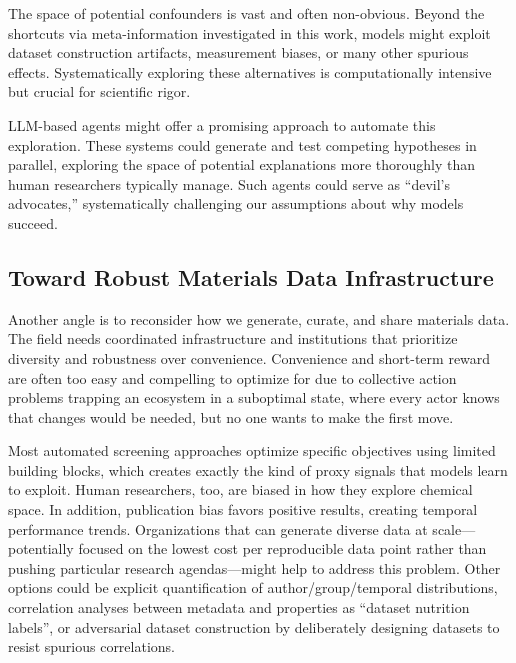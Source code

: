 \documentclass[11pt, oneside]{article}
\begin{document}
The space of potential confounders is vast and often non-obvious. Beyond the shortcuts via meta-information investigated in this work, models might exploit dataset construction artifacts, measurement biases, or many other spurious effects.\autocite{Zhou2025, Jones2024} 
Systematically exploring these alternatives is computationally intensive but crucial for scientific rigor.

LLM-based agents might offer a promising approach to automate this exploration.\autocite{Ramos2025, alampara2025general, narayanan2024aviary0, ghareeb2025robin0, mitchener2025kosmos0, ghafarollahi2025sciagents} 
These systems could generate and test competing hypotheses in parallel, exploring the space of potential explanations more thoroughly than human researchers typically manage. 
Such agents could serve as \enquote{devil's advocates,} systematically challenging our assumptions about why models succeed.

\subsection{Toward Robust Materials Data Infrastructure}

Another angle is to reconsider how we generate, curate, and share materials data. 
The field needs coordinated infrastructure and institutions that prioritize diversity and robustness over convenience. \autocite{Krishnan2025}
Convenience and short-term reward are often too easy and compelling to optimize for due to collective action problems trapping an ecosystem in a suboptimal state, where every actor knows that changes would be needed, but no one wants to make the first move.\autocite{Nielsen2020-rr} 

Most automated screening approaches optimize specific objectives using limited building blocks, which creates exactly the kind of proxy signals that models learn to exploit.  Human researchers, too,  are biased in how they explore chemical space.\autocite{Jia2019} In addition,  publication bias favors positive results, creating temporal performance trends.\autocite{Jablonka2022}
Organizations that can generate diverse data at scale---potentially focused on the lowest cost per reproducible data point rather than pushing particular research agendas---might help to address this problem. 
Other options could be explicit quantification of author/group/temporal distributions, correlation analyses between metadata and properties as \enquote{dataset nutrition labels}, or adversarial dataset construction by deliberately designing datasets to resist spurious correlations.
\end{document}
